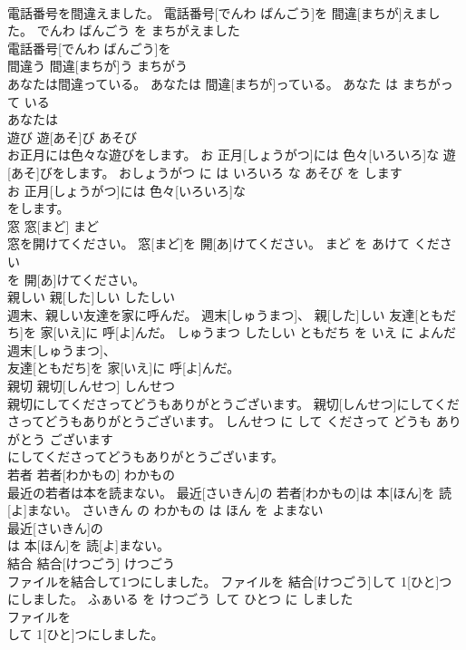 \documentclass[8pt]{extreport}
\begin{document}
\begin{CJK}{UTF8}{min}
\\	電話番号を間違えました。	電話番号[でんわ ばんごう]を 間違[まちが]えました。	でんわ ばんごう を まちがえました	
\\	電話番号[でんわ ばんごう]を
\\	間違う	間違[まちが]う	まちがう	
\\	あなたは間違っている。	あなたは 間違[まちが]っている。	あなた は まちがって いる	
\\	あなたは
\\	遊び	遊[あそ]び	あそび	
\\	お正月には色々な遊びをします。	お 正月[しょうがつ]には 色々[いろいろ]な 遊[あそ]びをします。	おしょうがつ に は いろいろ な あそび を します	
\\	お 正月[しょうがつ]には 色々[いろいろ]な
\\	をします。			
\\	窓	窓[まど]	まど	
\\	窓を開けてください。	窓[まど]を 開[あ]けてください。	まど を あけて ください	
\\	を 開[あ]けてください。			
\\	親しい	親[した]しい	したしい	
\\	週末、親しい友達を家に呼んだ。	週末[しゅうまつ]、 親[した]しい 友達[ともだち]を 家[いえ]に 呼[よ]んだ。	しゅうまつ したしい ともだち を いえ に よんだ	
\\	週末[しゅうまつ]、
\\	友達[ともだち]を 家[いえ]に 呼[よ]んだ。			
\\	親切	親切[しんせつ]	しんせつ	
\\	親切にしてくださってどうもありがとうございます。	親切[しんせつ]にしてくださってどうもありがとうございます。	しんせつ に して くださって どうも ありがとう ございます	
\\	にしてくださってどうもありがとうございます。			
\\	若者	若者[わかもの]	わかもの	
\\	最近の若者は本を読まない。	最近[さいきん]の 若者[わかもの]は 本[ほん]を 読[よ]まない。	さいきん の わかもの は ほん を よまない	
\\	最近[さいきん]の
\\	は 本[ほん]を 読[よ]まない。			
\\	結合	結合[けつごう]	けつごう	
\\	ファイルを結合して1つにしました。	ファイルを 結合[けつごう]して 1[ひと]つにしました。	ふぁいる を けつごう して ひとつ に しました	
\\	ファイルを
\\	して 1[ひと]つにしました。			

\end{CJK}
\end{document}
